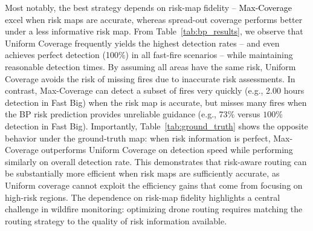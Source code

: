 \documentclass{article}
\newcommand{\danique}[1]{\textcolor{orange}{#1}}
\newcommand{\rev}[1]{\textcolor{black}{#1}}
\newcommand{\blue}[1]{\textcolor{black}{#1}}
\begin{document}
Most notably, the best strategy depends on risk-map fidelity -- \blue{Max-Coverage} excel when risk maps are accurate, whereas spread-out coverage performs better under a less informative risk map.
From Table~\ref{tab:bp_results}, we observe that Uniform Coverage frequently yields the highest detection rates -- and even achieves perfect detection (100$\%$) in all fast-fire scenarios -- while maintaining reasonable detection times. By assuming all areas have the same risk, Uniform Coverage avoids the risk of missing fires due to inaccurate risk assessments. In contrast, Max-Coverage can detect a subset of fires very quickly (e.g., 2.00 hours detection in Fast Big) when the risk map is accurate, but misses many fires when the BP risk prediction provides unreliable guidance (e.g., 73$\%$ versus $100\%$ detection in Fast Big). 
Importantly, Table~\ref{tab:ground_truth} shows the opposite behavior under the ground-truth map: when risk information is perfect, Max-Coverage outperforms Uniform Coverage on detection speed while performing similarly on overall detection rate. This demonstrates that risk-aware routing can be substantially more efficient when risk maps are sufficiently accurate, as Uniform coverage cannot exploit the efficiency gains that come from focusing on high-risk regions. The dependence on risk-map fidelity highlights a central challenge in wildfire monitoring: optimizing drone routing requires matching the routing strategy to the quality of risk information available.



\end{document}
